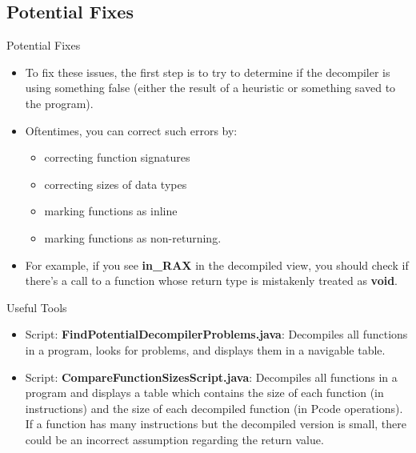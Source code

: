 \documentclass{beamer}
\begin{document}
\subsection{Potential Fixes}
\begin{frame}
\begin{block}{Potential Fixes}
\begin{itemize}
\item To fix these issues, the first step is to try to determine if the decompiler is using something false (either the result of a heuristic or something saved to the program).
\item Oftentimes, you can correct such errors by:
\begin{itemize}
\item correcting function signatures
\item correcting sizes of data types
\item marking functions as inline
\item marking functions as non-returning.
\end{itemize}
\item For example, if you see \textbf{in\_RAX} in the decompiled view, you should check if there's a call to a function whose return type is mistakenly treated as \textbf{void}.
\end{itemize}
\end{block}
\end{frame}

\begin{frame}
\begin{block}{Useful Tools}
\begin{itemize}
\item Script: \textbf{FindPotentialDecompilerProblems.java}: Decompiles all functions in a program, looks for problems, and displays them in a navigable table.
\item Script: \textbf{CompareFunctionSizesScript.java}: Decompiles all functions in a program and displays a table which contains the size of each function 
(in instructions) and the size of each decompiled function (in Pcode operations). If a function has many instructions but the decompiled version is small, 
there could be an incorrect assumption regarding the return value.
\end{itemize}
\end{block}
\end{frame}
\end{document}
